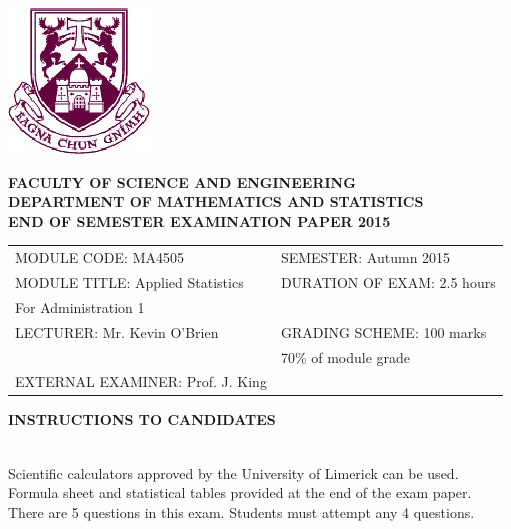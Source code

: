\documentclass[a4paper,12pt]{article}
\begin{document}
	\begin{center}
		\includegraphics[scale=0.55]{images/shieldtransparent2}
	\end{center}
	
	\begin{center}
		\vspace{1cm}
		\large \bf {FACULTY OF SCIENCE AND ENGINEERING} \\[0.5cm]
		\normalsize DEPARTMENT OF MATHEMATICS AND STATISTICS \\[1.25cm]
		\large \bf {END OF SEMESTER EXAMINATION PAPER 2015} \\[1.5cm]
	\end{center}
	
	\begin{tabular}{ll}
		MODULE CODE: MA4505 & SEMESTER: Autumn 2015 \\[1cm]
		MODULE TITLE: Applied Statistics & DURATION OF EXAM: 2.5 hours  \\
		\phantom{MODULE TITLE:} For Administration 1 & \\ [1cm]
		LECTURER: Mr. Kevin O'Brien & GRADING SCHEME: 100 marks \\
		& \phantom{GRADING SCHEME:} \footnotesize {70\% of module grade} \\[1cm]
EXTERNAL EXAMINER: Prof. J. King & \\
	\end{tabular}
\vspace{0.3cm}
	\begin{center}
		{\bf INSTRUCTIONS TO CANDIDATES}
	\end{center}
	
	{\noindent \\ Scientific calculators approved by the University of Limerick can be used. \\
		Formula sheet and statistical tables provided at the end of the exam paper.\\
		There are 5 questions in this exam. Students must attempt any 4 questions.}
	\newpage
\bigskip
\end{document}
